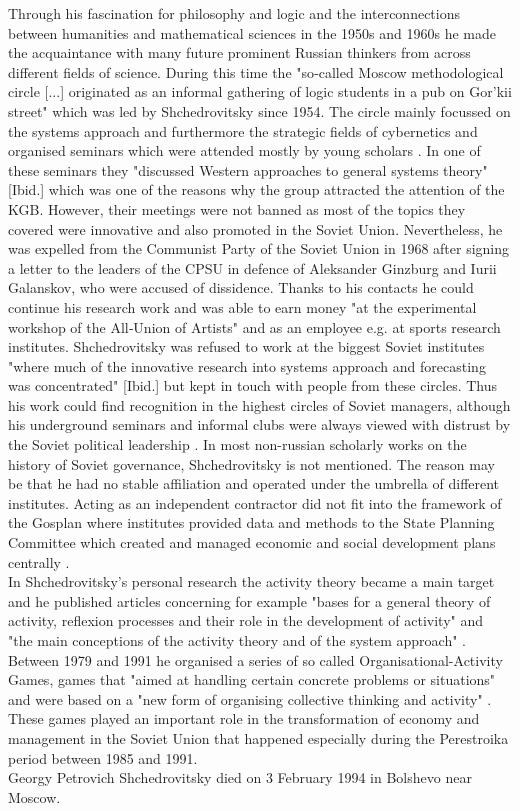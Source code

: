 \documentclass[11pt,a4paper]{article}
\begin{document}
Through his fascination for philosophy and logic and the interconnections between humanities and mathematical sciences in the 1950s and 1960s he made the acquaintance with many future prominent Russian thinkers from across different fields of science. During this time the "so‑called Moscow methodological circle [...] originated as an informal gathering of logic students in a pub on Gor’kii street" \cite[p. 7]{Rindzeviit2015} which was led by Shchedrovitsky since 1954. The circle mainly focussed on the systems approach and furthermore the strategic fields of cybernetics and organised seminars which were attended mostly by young scholars \cite[p. 8]{Rindzeviit2015}. In one of these seminars they "discussed Western approaches to general systems theory" [Ibid.] which was one of the reasons why the group attracted the attention of the KGB. However, their meetings were not banned as most of the topics they covered were innovative and also promoted in the Soviet Union. Nevertheless, he was expelled from the Communist Party of the Soviet Union in 1968 after signing a letter to the leaders of the CPSU in defence of Aleksander Ginzburg and Iurii Galanskov, who were accused of dissidence. Thanks to his contacts he could continue his research work and was able to earn money "at the experimental workshop of the All‑Union of Artists" \cite[p. 8]{Rindzeviit2015} and as an employee e.g. at sports research institutes. Shchedrovitsky was refused to work at the biggest Soviet institutes "where much of the innovative research into systems approach and forecasting was concentrated" [Ibid.] but kept in touch with people from these circles. Thus his work could find recognition in the highest circles of Soviet managers, although his underground seminars and informal clubs were always viewed with distrust by the Soviet political leadership \cite[p. 9]{Rindzeviit2015}.  In most non-russian scholarly works on the history of Soviet governance, Shchedrovitsky is not mentioned. The reason may be that he had no stable affiliation and operated under the umbrella of different institutes. Acting as an independent contractor did not fit into the framework of the Gosplan where institutes provided data and methods to the State Planning Committee which created and managed economic and social development plans centrally \cite[p. 7]{Rindzeviit2015}. \\
In Shchedrovitsky’s personal research the activity theory became a main target and he published articles concerning for example "bases for a general theory of activity, reflexion processes and their role in the development of activity" \cite[p. 3]{Davydova} and "the main conceptions of the activity theory and of the system approach" \cite[p. 4]{Davydova}. Between 1979 and 1991 he organised a series of so called Organisational-Activity Games, games that "aimed at handling certain concrete problems or situations" \cite{Naumov} and were based on a "new form of organising collective thinking and activity" \cite[p. 4]{Davydova}. These games played an important role in the transformation of economy and management in the Soviet Union that happened especially during the Perestroika period between 1985 and 1991. \\
Georgy Petrovich Shchedrovitsky died on 3 February 1994 in Bolshevo near Moscow.
\end{document}

